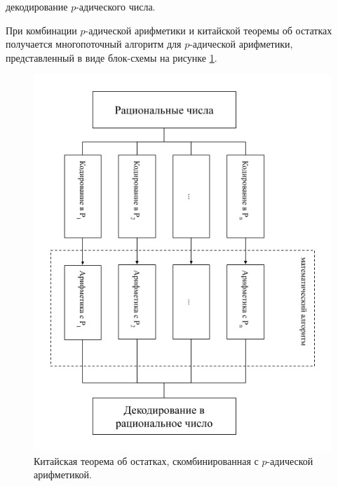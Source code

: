 \documentclass[master, och, times, pract]{sty/SCWorks}
\theoremstyle{plain}
\theoremstyle{definition}
\numberwithin{equation}{section}
\begin{document}
\begin{algorithm}
\DontPrintSemicolon %
\caption{декодирование $p$-адического числа.}
\label{algo:decoding}
\end{algorithm}

При комбинации $p$-адической арифметики и китайской теоремы об остатках получается многопоточный алгоритм для $p$-адической арифметики, представленный в виде блок-схемы на рисунке \ref{img:multi:schema}.

\begin{figure}[H]
\centerline{\includegraphics[width=0.7\linewidth]{images/multi/schema.png}}
\caption{Китайская теорема об остатках, скомбинированная с $p$-адической арифметикой.}
\label{img:multi:schema}
\end{figure}
\end{document}
